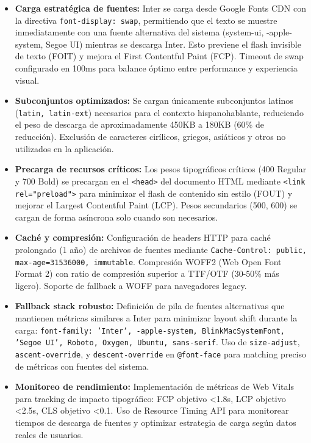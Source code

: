\documentclass[12pt,a4paper,oneside]{article}
\begin{document}
\begin{itemize}
    \item \textbf{Carga estratégica de fuentes:} Inter se carga desde Google Fonts CDN con la directiva \texttt{font-display: swap}, permitiendo que el texto se muestre inmediatamente con una fuente alternativa del sistema (system-ui, -apple-system, Segoe UI) mientras se descarga Inter. Esto previene el flash invisible de texto (FOIT) y mejora el First Contentful Paint (FCP). Timeout de swap configurado en 100ms para balance óptimo entre performance y experiencia visual.
    
    \item \textbf{Subconjuntos optimizados:} Se cargan únicamente subconjuntos latinos (\texttt{latin, latin-ext}) necesarios para el contexto hispanohablante, reduciendo el peso de descarga de aproximadamente 450KB a 180KB (60\% de reducción). Exclusión de caracteres cirílicos, griegos, asiáticos y otros no utilizados en la aplicación.
    
    \item \textbf{Precarga de recursos críticos:} Los pesos tipográficos críticos (400 Regular y 700 Bold) se precargan en el \texttt{<head>} del documento HTML mediante \texttt{<link rel="preload">} para minimizar el flash de contenido sin estilo (FOUT) y mejorar el Largest Contentful Paint (LCP). Pesos secundarios (500, 600) se cargan de forma asíncrona solo cuando son necesarios.
    
    \item \textbf{Caché y compresión:} Configuración de headers HTTP para caché prolongado (1 año) de archivos de fuentes mediante \texttt{Cache-Control: public, max-age=31536000, immutable}. Compresión WOFF2 (Web Open Font Format 2) con ratio de compresión superior a TTF/OTF (30-50\% más ligero). Soporte de fallback a WOFF para navegadores legacy.
    
    \item \textbf{Fallback stack robusto:} Definición de pila de fuentes alternativas que mantienen métricas similares a Inter para minimizar layout shift durante la carga: \texttt{font-family: 'Inter', -apple-system, BlinkMacSystemFont, 'Segoe UI', Roboto, Oxygen, Ubuntu, sans-serif}. Uso de \texttt{size-adjust}, \texttt{ascent-override}, y \texttt{descent-override} en \texttt{@font-face} para matching preciso de métricas con fuentes del sistema.
    
    \item \textbf{Monitoreo de rendimiento:} Implementación de métricas de Web Vitals para tracking de impacto tipográfico: FCP objetivo <1.8s, LCP objetivo <2.5s, CLS objetivo <0.1. Uso de Resource Timing API para monitorear tiempos de descarga de fuentes y optimizar estrategia de carga según datos reales de usuarios.
\end{itemize}
\end{document}
